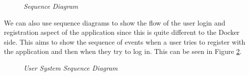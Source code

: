 \begin{figure}[!ht]
\centering
{}
\caption{\em Sequence Diagram}
\label{fig:sequence_diagram}
\end{figure}

We can also use sequence diagrams to show the flow of the user login and registration aspect of the application since this is quite different to the Docker side. This aims to show the sequence of events when a user tries to register with the application and then when they try to log in. This can be seen in Figure \ref{fig:user_sequence_diagram}.

\begin{figure}[!ht]
\centering
{}
\caption{\em User System Sequence Diagram}
\label{fig:user_sequence_diagram}
\end{figure}

